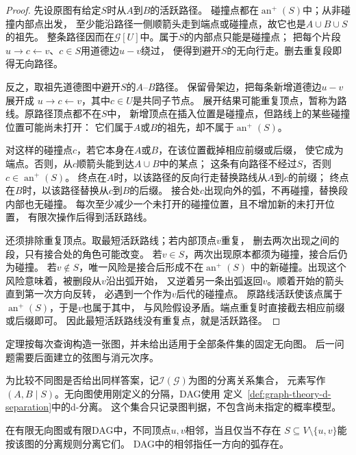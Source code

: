 \begin{proof}
先设原图有给定\(S\)时从\(A\)到\(B\)的活跃路径。
碰撞点都在\(\operatorname{an}^{+}(S)\)中；从非碰撞内部点出发，
至少能沿路径一侧顺箭头走到端点或碰撞点，故它也是\(A\cup B\cup S\)的祖先。
整条路径因而在\(\mathcal G[U]\)中。属于\(S\)的内部点只能是碰撞点；
把每个片段\(u\to c\leftarrow v\)、\(c\in S\)用道德边\(u-v\)绕过，
便得到避开\(S\)的无向行走。删去重复段即得无向路径。

反之，取祖先道德图中避开\(S\)的\(A\)--\(B\)路径。
保留骨架边，把每条新增道德边\(u-v\)展开成
\(u\to c\leftarrow v\)，其中\(c\in U\)是共同子节点。
展开结果可能重复顶点，暂称为路线。原路径顶点都不在\(S\)中，
新增顶点在插入位置是碰撞点，但路线上的某些碰撞位置可能尚未打开：
它们属于\(A\)或\(B\)的祖先，却不属于\(\operatorname{an}^{+}(S)\)。

对这样的碰撞点\(c\)，若它本身在\(A\)或\(B\)，在该位置截掉相应前缀或后缀，
使它成为端点。否则，从\(c\)顺箭头能到达\(A\cup B\)中的某点；
这条有向路径不经过\(S\)，否则\(c\in\operatorname{an}^{+}(S)\)。
终点在\(A\)时，以该路径的反向行走替换路线从\(A\)到\(c\)的前缀；
终点在\(B\)时，以该路径替换从\(c\)到\(B\)的后缀。
接合处\(c\)出现向外的弧，不再碰撞，替换段内部也无碰撞。
每次至少减少一个未打开的碰撞位置，且不增加新的未打开位置，
有限次操作后得到活跃路线。

还须排除重复顶点。取最短活跃路线；若内部顶点\(v\)重复，
删去两次出现之间的段，只有接合处的角色可能改变。
若\(v\in S\)，两次出现原本都须为碰撞，接合后仍为碰撞。
若\(v\notin S\)，唯一风险是接合后形成不在\(\operatorname{an}^{+}(S)\)
中的新碰撞。出现这个风险意味着，被删段从\(v\)沿出弧开始，
又逆着另一条出弧返回\(v\)。顺着开始的箭头直到第一次方向反转，
必遇到一个作为\(v\)后代的碰撞点。
原路线活跃使该点属于\(\operatorname{an}^{+}(S)\)，于是\(v\)也属于其中，
与风险假设矛盾。端点重复时直接截去相应前缀或后缀即可。
因此最短活跃路线没有重复点，就是活跃路径。
\end{proof}

定理按每次查询构造一张图，并未给出适用于全部条件集的固定无向图。
后一问题需要后面建立的弦图与消元次序。

为比较不同图是否给出同样答案，记\(\mathcal I(\mathcal G)\)为图的分离关系集合，
元素写作\((A,B\mid S)\)。无向图使用刚定义的分隔，DAG使用
定义~\ref{def:graph-theory-d-separation}中的d-分离。
这个集合只记录图判据，不包含尚未指定的概率模型。

\begin{lemma}[分离关系中的邻接判据]
  \label{lem:graph-theory-separation-adjacency}
  在有限无向图或有限DAG中，不同顶点\(u,v\)相邻，当且仅当不存在
  \(S\subseteq V\setminus\{u,v\}\)能按该图的分离规则分离它们。
  DAG中的相邻指任一方向的弧存在。
\end{lemma}

